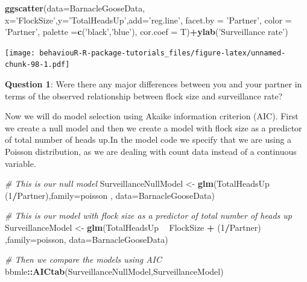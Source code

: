 \documentclass[]{book}
\newenvironment{Shaded}{\begin{snugshade}}{\end{snugshade}}
\newcommand{\CommentTok}[1]{\textcolor[rgb]{0.56,0.35,0.01}{\textit{#1}}}
\newcommand{\DataTypeTok}[1]{\textcolor[rgb]{0.13,0.29,0.53}{#1}}
\newcommand{\DecValTok}[1]{\textcolor[rgb]{0.00,0.00,0.81}{#1}}
\newcommand{\KeywordTok}[1]{\textcolor[rgb]{0.13,0.29,0.53}{\textbf{#1}}}
\newcommand{\NormalTok}[1]{#1}
\newcommand{\OperatorTok}[1]{\textcolor[rgb]{0.81,0.36,0.00}{\textbf{#1}}}
\newcommand{\StringTok}[1]{\textcolor[rgb]{0.31,0.60,0.02}{#1}}
\begin{document}
\begin{Shaded}
\begin{Highlighting}[]
\KeywordTok{ggscatter}\NormalTok{(}\DataTypeTok{data=}\NormalTok{BarnacleGooseData,}
          \DataTypeTok{x=}\StringTok{'FlockSize'}\NormalTok{,}\DataTypeTok{y=}\StringTok{'TotalHeadsUp'}\NormalTok{,}\DataTypeTok{add=}\StringTok{'reg.line'}\NormalTok{, }\DataTypeTok{facet.by =} \StringTok{'Partner'}\NormalTok{,}
          \DataTypeTok{color =} \StringTok{'Partner'}\NormalTok{, }\DataTypeTok{palette =}\KeywordTok{c}\NormalTok{(}\StringTok{'black'}\NormalTok{,}\StringTok{'blue'}\NormalTok{),}
          \DataTypeTok{cor.coef =}\NormalTok{ T)}\OperatorTok{+}\KeywordTok{ylab}\NormalTok{(}\StringTok{'Surveillance rate'}\NormalTok{)}
\end{Highlighting}
\end{Shaded}

\texttt{[image: behaviouR-R-package-tutorials\_files/figure-latex/unnamed-chunk-98-1.pdf]}

\textbf{Question 1}: Were there any major differences between you and your partner in terms of the observed relationship between flock size and surveillance rate?

Now we will do model selection using Akaike information criterion (AIC). First we create a null model and then we create a model with flock size as a predictor of total number of heads up.In the model code we specify that we are using a Poisson distribution, as we are dealing with count data instead of a continuous variable.

\begin{Shaded}
\begin{Highlighting}[]
\CommentTok{# This is our null model}
\NormalTok{SurveillanceNullModel <-}\StringTok{ }\KeywordTok{glm}\NormalTok{(TotalHeadsUp }\OperatorTok{~}\StringTok{ }\NormalTok{(}\DecValTok{1}\OperatorTok{/}\NormalTok{Partner),}\DataTypeTok{family=}\NormalTok{poisson , }\DataTypeTok{data=}\NormalTok{BarnacleGooseData)}

\CommentTok{# This is our model with flock size as a predictor of total number of heads up}
\NormalTok{SurveillanceModel <-}\StringTok{ }\KeywordTok{glm}\NormalTok{(TotalHeadsUp }\OperatorTok{~}\StringTok{ }\NormalTok{FlockSize }\OperatorTok{+}\StringTok{ }\NormalTok{(}\DecValTok{1}\OperatorTok{/}\NormalTok{Partner) ,}\DataTypeTok{family=}\NormalTok{poisson, }\DataTypeTok{data=}\NormalTok{BarnacleGooseData)}

\CommentTok{# Then we compare the models using AIC}
\NormalTok{bbmle}\OperatorTok{::}\KeywordTok{AICtab}\NormalTok{(SurveillanceNullModel,SurveillanceModel)}
\end{Highlighting}
\end{Shaded}
\end{document}
